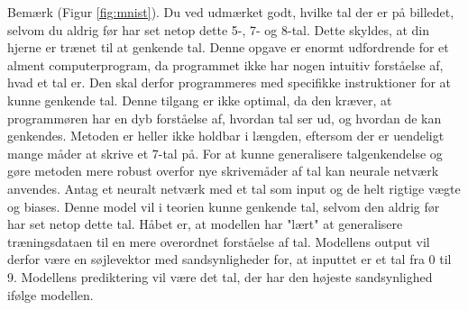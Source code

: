 \documentclass{article}
\newcommand{\figureref}[1]{(Figur \ref{#1})}
\begin{document}
Bemærk \figureref{fig:mnist}. Du ved udmærket godt, hvilke tal der er på billedet, selvom du aldrig før har set netop dette 5-, 7- og 8-tal. Dette skyldes, at din hjerne er trænet til at genkende tal. Denne opgave er enormt udfordrende for et alment computerprogram, da programmet ikke har nogen intuitiv forståelse af, hvad et tal er. Den skal derfor programmeres med specifikke instruktioner for at kunne genkende tal. Denne tilgang er ikke optimal, da den kræver, at programmøren har en dyb forståelse af, hvordan tal ser ud, og hvordan de kan genkendes. Metoden er heller ikke holdbar i længden, eftersom der er uendeligt mange måder at skrive et 7-tal på. For at kunne generalisere talgenkendelse og gøre metoden mere robust overfor nye skrivemåder af tal kan neurale netværk anvendes. Antag et neuralt netværk med et tal som input og de helt rigtige vægte og biases. Denne model vil i teorien kunne genkende tal, selvom den aldrig før har set netop dette tal. Håbet er, at modellen har "lært" at generalisere træningsdataen til en mere overordnet forståelse af tal. Modellens output vil derfor være en søjlevektor med sandsynligheder for, at inputtet er et tal fra 0 til 9. Modellens prediktering vil være det tal, der har den højeste sandsynlighed ifølge modellen. \parencite{sanderson2017neural}
\clearpage
\end{document}
